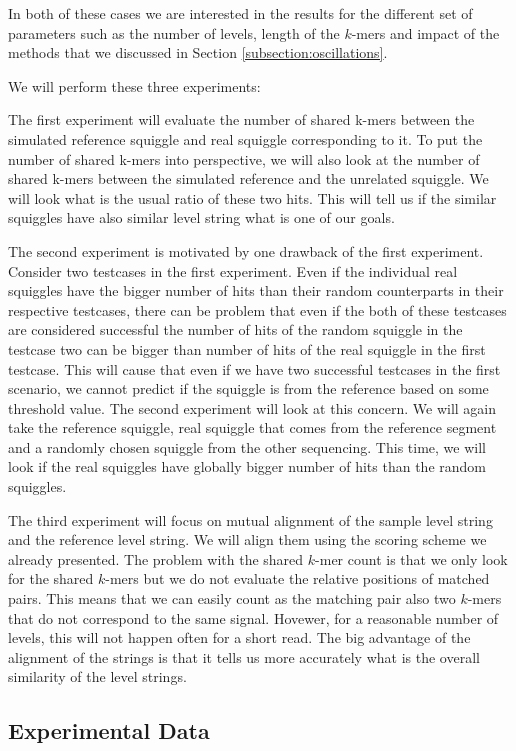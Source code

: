 In both of these cases we are interested in the results for the different set of parameters
such as the number of levels, length of the $k$-mers and impact of the methods that we
discussed in Section \ref{subsection:oscillations}.

We will perform these three experiments:

The first experiment will evaluate the number of shared k-mers between the simulated
reference squiggle and real squiggle corresponding to it. To put the number of shared
k-mers into perspective, we will also look at the number of shared k-mers between the
simulated reference and the unrelated squiggle. We will look what is the usual ratio
of these two hits. This will tell us if the similar squiggles have also similar level
string what is one of our goals.

The second experiment is motivated by one drawback of the first experiment. Consider
two testcases in the first experiment. Even if the individual real squiggles have
the bigger number of hits than their random counterparts in their respective testcases,
there can be problem that even if the both of these testcases are considered successful
the number of hits of the random squiggle in the testcase two can be bigger than
number of hits of the real squiggle in the first testcase. This will cause that
even if we have two successful testcases in the first scenario, we cannot predict
if the squiggle is from the reference based on some threshold value.
The second experiment will look at this concern. We will again take
the reference squiggle, real squiggle that comes from the reference segment and a
randomly chosen squiggle from the other sequencing. This time, we will look if the
real squiggles have globally bigger number of hits than the random squiggles.

The third experiment will focus on mutual alignment of the sample
level string and the reference level string. We will align them using the scoring
scheme we already presented. The problem with the shared $k$-mer count is that we only look
for the shared $k$-mers but we do not evaluate the relative positions of matched pairs.
This means that we can easily count as the matching pair also two $k$-mers that
do not correspond to the same signal. Hovewer, for a reasonable number of levels, this will
not happen often for a short read. The big advantage of the alignment of the strings
is that it tells us more accurately what is the overall similarity of the level strings.

\subsection{Experimental Data}

